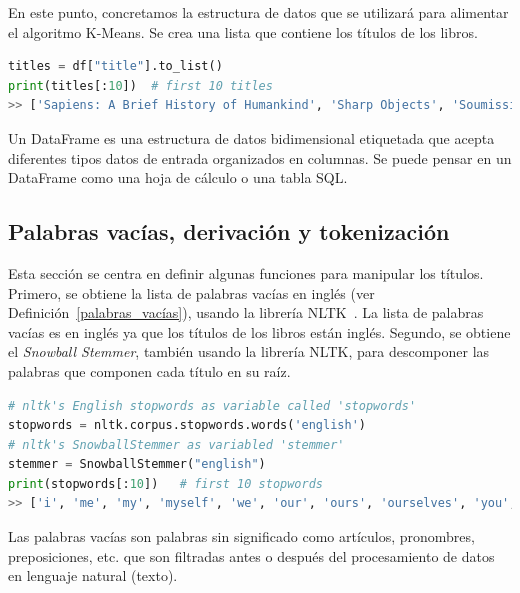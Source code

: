 \documentclass{uimppracticas}
\begin{document}
En este punto, concretamos la estructura de datos que se utilizará para alimentar el algoritmo K-Means. Se crea una lista que contiene los títulos de los libros.

\begin{lstlisting}[language=python]
titles = df["title"].to_list()
print(titles[:10])  # first 10 titles
>> ['Sapiens: A Brief History of Humankind', 'Sharp Objects', 'Soumission', 'Tipping the Velvet', 'A Light in the Attic', "It's Only the Himalayas", 'Libertarianism for Beginners', 'Mesaerion: The Best Science Fiction Stories 1800-1849', 'Olio', 'Our Band Could Be Your Life: Scenes from the American Indie Underground, 1981-1991']
\end{lstlisting}

\begin{definition}\label{dataframe}
Un DataFrame es una estructura de datos bidimensional etiquetada que acepta diferentes tipos datos de entrada organizados en columnas. Se puede pensar en un DataFrame como una hoja de cálculo o una tabla SQL.
\end{definition}

\subsection{Palabras vacías, derivación y tokenización}

Esta sección se centra en definir algunas funciones para manipular los títulos. Primero, se obtiene la lista de palabras vacías en inglés (ver Definición~\ref{palabras_vacías}), usando la librería NLTK~\cite{bird2009natural}. La lista de palabras vacías es en inglés ya que los títulos de los libros están inglés. Segundo, se obtiene el \textit{Snowball Stemmer}, también usando la librería NLTK, para descomponer las palabras que componen cada título en su raíz.

\begin{lstlisting}[language=python]
# nltk's English stopwords as variable called 'stopwords'	
stopwords = nltk.corpus.stopwords.words('english')  
# nltk's SnowballStemmer as variabled 'stemmer'
stemmer = SnowballStemmer("english")
print(stopwords[:10])   # first 10 stopwords
>> ['i', 'me', 'my', 'myself', 'we', 'our', 'ours', 'ourselves', 'you', "you're"]    
\end{lstlisting}

\begin{definition}\label{palabras_vacías}
	Las palabras vacías son palabras sin significado como artículos, pronombres, preposiciones, etc. que son filtradas antes o después del procesamiento de datos en lenguaje natural (texto).
\end{definition}
\end{document}
